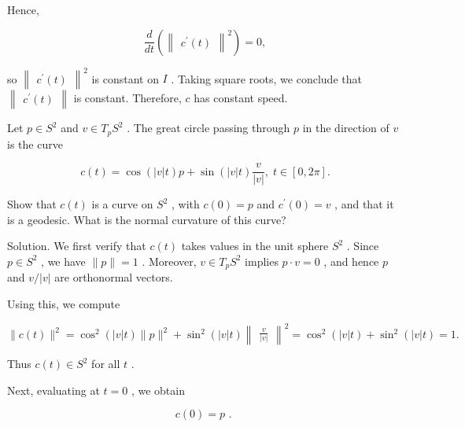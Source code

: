 \documentclass[10pt]{article}
\begin{document}
Hence,

\[
\frac{d}{dt}\left( {\begin{Vmatrix}{c}^{\prime }\left( t\right) \end{Vmatrix}}^{2}\right)  = 0,
\]

so \({\begin{Vmatrix}{c}^{\prime }\left( t\right) \end{Vmatrix}}^{2}\) is constant on \(I\) . Taking square roots, we conclude that \(\begin{Vmatrix}{{c}^{\prime }\left( t\right) }\end{Vmatrix}\) is constant. Therefore, \(c\) has constant speed.

\begin{problem}[title=PROBLEM 2 (5 POINTS)]
Let \(p \in  {S}^{2}\) and \(v \in  {T}_{p}{S}^{2}\) . The great circle passing through \(p\) in the direction of \(v\) is the curve

\[
c\left( t\right)  = \cos \left( {\left| v\right| t}\right) p + \sin \left( {\left| v\right| t}\right) \frac{v}{\left| v\right| },\;t \in  \left\lbrack  {0,{2\pi }}\right\rbrack  .
\]

Show that \(c\left( t\right)\) is a curve on \({S}^{2}\) , with \(c\left( 0\right)  = p\) and \({c}^{\prime }\left( 0\right)  = v\) , and that it is a geodesic. What is the normal curvature of this curve?
\end{problem}

Solution. We first verify that \(c\left( t\right)\) takes values in the unit sphere \({S}^{2}\) . Since \(p \in  {S}^{2}\) , we have \(\parallel p\parallel  = 1\) . Moreover, \(v \in  {T}_{p}{S}^{2}\) implies \(p \cdot  v = 0\) , and hence \(p\) and \(v/\left| v\right|\) are orthonormal vectors.

Using this, we compute

\[
\parallel c\left( t\right) {\parallel }^{2} = {\cos }^{2}\left( {\left| v\right| t}\right) \parallel p{\parallel }^{2} + {\sin }^{2}\left( {\left| v\right| t}\right) {\begin{Vmatrix}\frac{v}{\left| v\right| }\end{Vmatrix}}^{2} = {\cos }^{2}\left( {\left| v\right| t}\right)  + {\sin }^{2}\left( {\left| v\right| t}\right)  = 1.
\]

Thus \(c\left( t\right)  \in  {S}^{2}\) for all \(t\) .

Next, evaluating at \(t = 0\) , we obtain

\[
c\left( 0\right)  = p\text{ . }
\]
\end{document}
